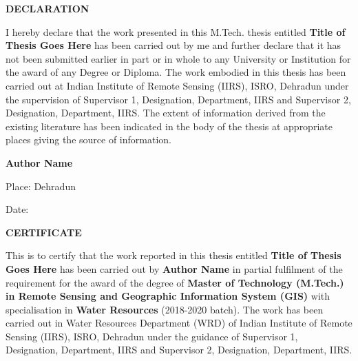 \documentclass[
12pt, %
english,
onehalfspacing, %
headsepline, %
]{MastersDoctoralThesis} %
\begin{document}
\cleardoublepage
\newpage


\begin{center}
    \LARGE{\textbf{DECLARATION}}
\end{center}

\vspace*{0.01\textheight}

I hereby declare that the work presented in this M.Tech. thesis entitled \textbf{Title of Thesis Goes Here} has been carried out by me and further declare that it has not been submitted earlier in part or in whole to any University or Institution for the award of any Degree or Diploma. The work embodied in this thesis has been carried out at Indian Institute of Remote Sensing (IIRS), ISRO, Dehradun under the supervision of Supervisor 1, Designation, Department, IIRS and Supervisor 2, Designation, Department, IIRS. The extent of information derived from the existing literature has been indicated in the body of the thesis at appropriate places giving the source of information. 

\vspace*{0.05\textheight}

\begin{flushright}
    \textbf{Author Name}
\end{flushright}

\vspace*{0.05\textheight}

Place: Dehradun

\vspace*{0.01\textheight}

Date: 

\cleardoublepage
\newpage



\begin{center}
    \LARGE{\textbf{CERTIFICATE}}
\end{center}

\vspace*{0.01\textheight}

This is to certify that the work reported in this thesis entitled \textbf{Title of Thesis Goes Here} has been carried out by \textbf{Author Name} in partial fulfilment of the requirement for the award of the degree of \textbf{Master of Technology (M.Tech.) in Remote Sensing and Geographic Information System (GIS)} with specialisation in \textbf{Water Resources} (2018-2020 batch). The work has been carried out in Water Resources Department (WRD) of Indian Institute of Remote Sensing (IIRS), ISRO, Dehradun under the guidance of Supervisor 1, Designation, Department, IIRS and Supervisor 2, Designation, Department, IIRS.
\end{document}
